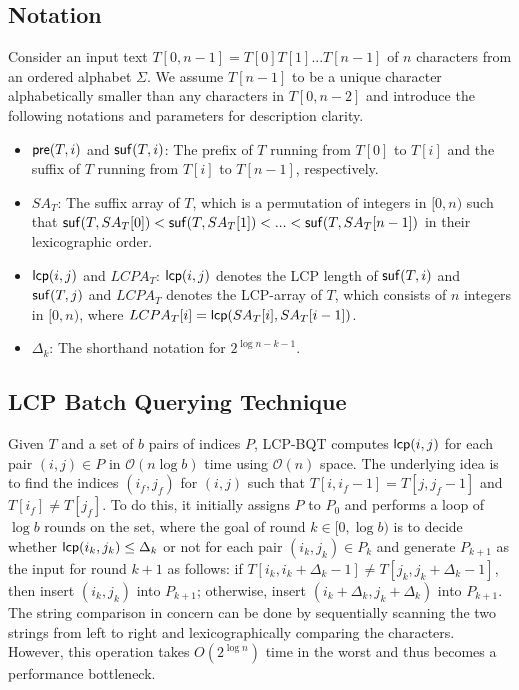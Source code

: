 \documentclass[10pt,journal,compsoc]{IEEEtran}
\begin{document}
\begin{CJK*}{GBK}{song}
\subsection{Notation}\label{subsec:basic_notations}

Consider an input text $T[0,n-1] =T[0]T[1]...T[n-1]$ of $n$ characters from an ordered alphabet $\Sigma$. We assume $T[n-1]$ to be a unique character alphabetically smaller than any characters in $T[0,n-2]$ and introduce the following notations and parameters for description clarity.

\begin{itemize}
\item ${\sf pre}(T,i)$ and ${\sf suf}(T,i)$: The prefix of $T$ running from $T[0]$ to $T[i]$ and the suffix of $T$ running from $T[i]$ to $T[n-1]$, respectively.
\item $SA_T$: The suffix array of $T$, which is a permutation of integers in $[0,n)$ such that ${\sf suf}(T,SA_T[0])<{\sf suf}(T,SA_T[1])<...<{\sf suf}(T,SA_T[n-1])$ in their lexicographic order.
\item ${\sf lcp}(i,j)$ and $LCPA_T$: ${\sf lcp}(i,j)$ denotes the LCP length of ${\sf suf}(T,i)$ and ${\sf suf}(T,j)$ and $LCPA_T$ denotes the LCP-array of $T$, which consists of $n$ integers in $[0,n)$, where $LCPA_T[i]= {\sf lcp}(SA_T[i],SA_T[i-1])$.
\item $\Delta_{k}$: The shorthand notation for $2^{\log n - k - 1}$.
\end{itemize}

\subsection{LCP Batch Querying Technique}\label{subsec:lcp_batch_querying_technique}

Given $T$ and a set of $b$ pairs of indices $P$, LCP-BQT computes ${\sf lcp}(i,j)$ for each pair $(i,j)\in P$ in $\mathcal{O}(n\log b)$ time using $\mathcal{O}(n)$ space. The underlying idea is to find the indices $(i_{f}, j_{f})$ for $(i,j)$ such that $T[i,i_{f}-1]=T[j,j_{f}-1]$ and $T[i_{f}] \neq T[j_{f}]$. To do this, it initially assigns $P$ to $P_0$ and performs a loop of $\log b$ rounds on the set, where the goal of round $k\in [0,\log b)$ is to decide whether ${\sf lcp}(i_k,j_k) \le \Delta_k$ or not for each pair $(i_k,j_k)\in P_k$ and generate $P_{k+1}$ as the input for round $k+1$ as follows: if $T[i_k,i_k+\Delta_k-1] \neq T[j_k,j_k+\Delta_k-1]$, then insert $(i_k,j_k)$ into $P_{k+1}$; otherwise, insert $(i_k+\Delta_k,j_k+\Delta_k)$ into $P_{k+1}$. The string comparison in concern can be done by sequentially scanning the two strings from left to right and lexicographically comparing the characters. However, this operation takes $O(2^{\log n})$ time in the worst and thus becomes a performance bottleneck.


\end{CJK*}
\end{document}
